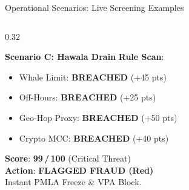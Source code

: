 \documentclass[aspectratio=169,10pt]{beamer}
\begin{document}
\begin{frame}{Operational Scenarios: Live Screening Examples}
\begin{columns}[t]
\begin{column}{0.32\textwidth}
\begin{block}{\textbf{Scenario C: Hawala Drain}}
        \textbf{Rule Scan}:
        \begin{itemize}
          \tiny
          \item Whale Limit: \textcolor{statusRed}{\textbf{BREACHED}} (+45 pts)
          \item Off-Hours: \textcolor{statusRed}{\textbf{BREACHED}} (+25 pts)
          \item Geo-Hop Proxy: \textcolor{statusRed}{\textbf{BREACHED}} (+50 pts)
          \item Crypto MCC: \textcolor{statusRed}{\textbf{BREACHED}} (+40 pts)
        \end{itemize}
        \par\vspace{0.2em}\dotfill\par

        \textbf{Score}: \textbf{99\,/\,100} (Critical Threat)\\
        \textbf{Action}: \textcolor{statusRed}{\textbf{FLAGGED FRAUD (Red)}}\\[1pt]
        \tiny Instant PMLA Freeze \& VPA Block.
      \end{block}
    \end{column}
  \end{columns}
\end{frame}
\end{document}

